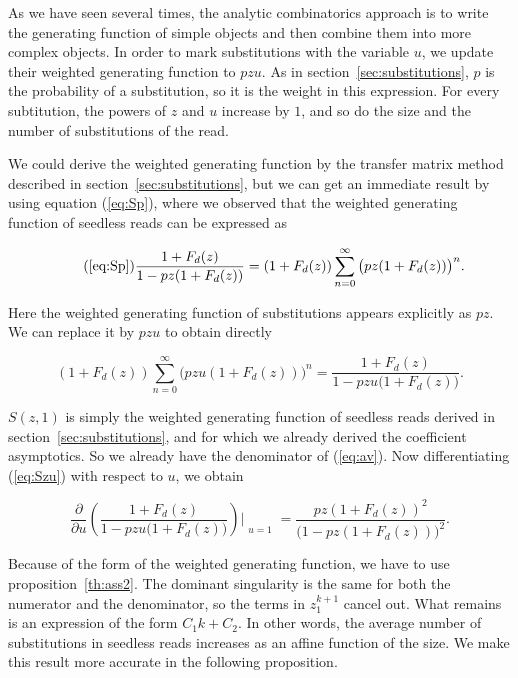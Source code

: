 \documentclass{article}
\begin{document}
As we have seen several times, the analytic combinatorics approach is to
write the generating function of simple objects and then combine them into
more complex objects. In order to mark substitutions with the variable
$u$, we update their weighted generating function to $pzu$. As in
section~\ref{sec:substitutions}, $p$ is the probability of a substitution,
so it is the weight in this expression. For every subtitution, the powers
of $z$ and $u$ increase by $1$, and so do the size and the number of
substitutions of the read.

We could derive the weighted generating function by the transfer matrix
method described in section~\ref{sec:substitutions}, but we can get an
immediate result by using equation (\ref{eq:Sp}), where we observed
that the weighted generating function of seedless reads can be expressed
as

\begin{equation}
\tag{\ref{eq:Sp}}
\frac{1+F_d(z)}{1-pz(1+F_d(z))} =
(1+F_d(z)) \sum_{n=0}^\infty \big( pz(1+F_d(z)) \big)^n.
\end{equation}

Here the weighted generating function of substitutions appears explicitly
as $pz$. We can replace it by $pzu$ to obtain directly

\begin{equation}
\label{eq:Szu}
(1+F_d(z)) \sum_{n=0}^\infty \big( pzu(1+F_d(z)) \big)^n
= \frac{1+F_d(z)}{1-pzu\big( 1+F_d(z) \big)}.
\end{equation}


$S(z,1)$ is simply the weighted generating function of seedless reads
derived in section~\ref{sec:substitutions}, and for which we already
derived the coefficient asymptotics. So we already have the denominator of
(\ref{eq:av}). Now differentiating (\ref{eq:Szu}) with respect to $u$, we
obtain

\begin{equation}
\label{eq:dSdu}
\frac{\partial }{\partial u}
\left(\frac{1+F_d(z)}{1-pzu\big( 1+F_d(z) \big)}
\right) \Biggr|_{\substack{\\u=1}} = 
\frac{pz(1+F_d(z))^2}{\big( 1 - pz(1+F_d(z)) \big)^2}.
\end{equation}

Because of the form of the weighted generating function, we have to use
proposition~\ref{th:ass2}. The dominant singularity is the same for both
the numerator and the denominator, so the terms in $z_1^{k+1}$ cancel out.
What remains is an expression of the form $C_1k + C_2$. In other words,
the average number of substitutions in seedless reads increases as an
affine function of the size. We make this result more accurate in the
following proposition.
\end{document}
